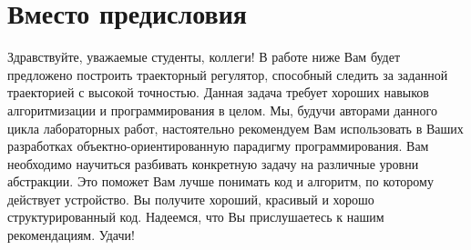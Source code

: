 \documentclass[12pt,a4paper,openany]{extarticle}
\begin{document}
\part*{Вместо предисловия}
\hspace*{\parindent}Здравствуйте, уважаемые студенты, коллеги! В работе ниже Вам будет предложено построить траекторный регулятор, способный следить за заданной траекторией с высокой точностью. Данная задача требует хороших навыков алгоритмизации и программирования в целом. Мы, будучи авторами данного цикла лабораторных работ, настоятельно рекомендуем Вам использовать в Ваших разработках объектно-ориентированную парадигму программирования. Вам необходимо научиться разбивать конкретную задачу на различные уровни абстракции. Это поможет Вам лучше понимать код и алгоритм, по которому действует устройство. Вы получите хороший, красивый и хорошо структурированный код. Надеемся, что Вы прислушаетесь к нашим рекомендациям. Удачи!
\end{document}
